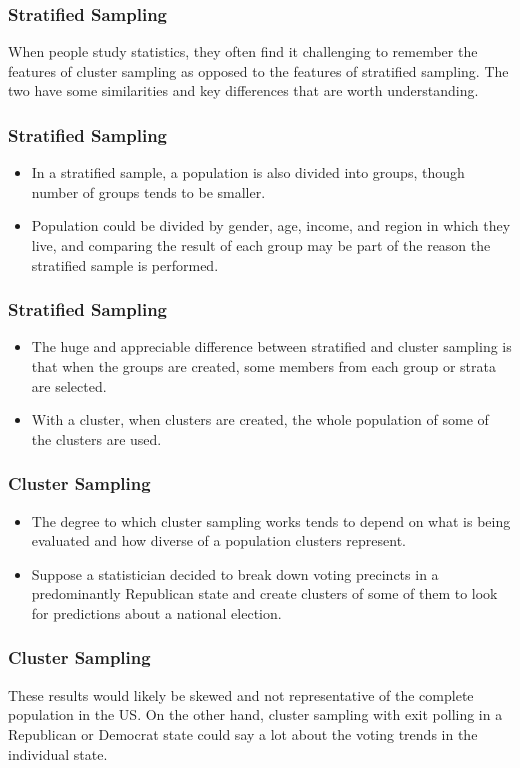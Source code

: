 \documentclass{beamer}
\begin{document}
\begin{frame}
\frametitle{Stratified Sampling}
\Large
When people study statistics, they often find it challenging to remember the features of cluster sampling as opposed to the features of stratified sampling. The two have some similarities and key differences that are worth understanding. 
\end{frame}
\begin{frame}
\frametitle{Stratified Sampling}
\Large
\begin{itemize}
\item In a stratified sample, a population is also divided into groups, though number of groups tends to be smaller. \item Population could be divided by gender, age, income, and region in which they live, and comparing the result of each group may be part of the reason the stratified sample is performed. 
\end{itemize}
\end{frame}
\begin{frame}
\frametitle{Stratified Sampling}
\Large
\begin{itemize}
\item The huge and appreciable difference between stratified and cluster sampling is that when the groups are created, some members from each group or strata are selected. 
\item With a cluster, when clusters are created, the whole population of some of the clusters are used. 
\end{itemize}
\end{frame}
\begin{frame}
\frametitle{Cluster Sampling}
\Large
\begin{itemize}
\item The degree to which cluster sampling works tends to depend on what is being evaluated and how diverse of a population clusters represent.
\item  Suppose a statistician decided to break down voting precincts in a predominantly Republican state and create clusters of some of them to look for predictions about a national election.
\end{itemize}
\end{frame}
\begin{frame}
\frametitle{Cluster Sampling}
\Large
 These results would likely be skewed and not representative of the complete population in the US. On the other hand, cluster sampling with exit polling in a Republican or Democrat state could say a lot about the voting trends in the individual state. 


\end{frame}
\end{document}
